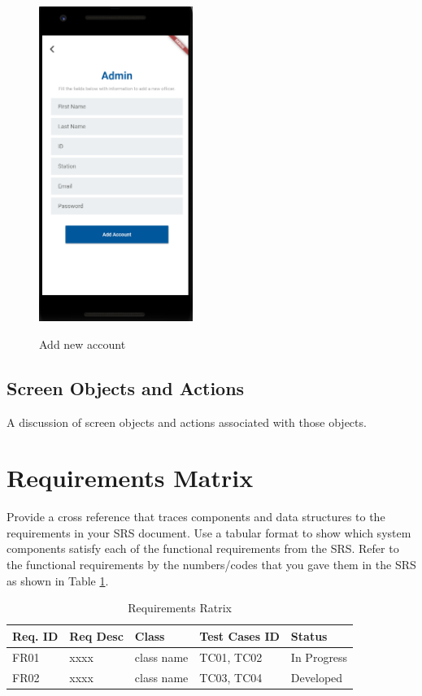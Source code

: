 \documentclass[12pt]{article}
\begin{document}
\begin{figure}[h]
  \centering
  \includegraphics[width=5cm]{AddAccount.PNG}
  \label{fig:2}
   \caption{Add new account}
\end{figure}

\subsection {Screen Objects and Actions}
A discussion of screen objects and actions associated with those objects.

\section{Requirements Matrix}
Provide a cross reference that traces components and data structures to the requirements in your SRS document.
Use  a  tabular  format to show  which system  components satisfy each of the  functional 
requirements from the SRS. Refer to the functional requirements by the numbers/codes that you gave them in the SRS as shown in Table \ref{tab:RM}.

\begin{table}[htbp]
\centering
\caption{Requirements Ratrix}
\label{tab:RM}
\begin{tabular}{|l|l|l|l|l|}
\hline
Req. ID  & Req Desc & Class & Test Cases ID & Status      \\ \hline
FR01     & xxxx     & class name & TC01, TC02    & In Progress \\ \hline
FR02     & xxxx     & class name & TC03, TC04    & Developed   \\ \hline
\end{tabular}
\end{table}
\end{document}
